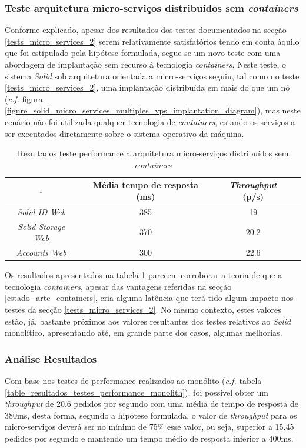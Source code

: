 \subsubsection{Teste arquitetura micro-serviços distribuídos sem \emph{containers} \label{tests_micro_services_3}}

Conforme explicado, apesar dos resultados dos testes documentados na secção \ref{tests_micro_services_2} serem relativamente satisfatórios tendo em conta àquilo que foi estipulado pela hipótese formulada, segue-se um novo teste com uma abordagem de implantação sem recurso à tecnologia \emph{containers}.
Neste teste, o sistema \emph{Solid} sob arquitetura orientada a micro-serviços seguiu, tal como no teste \ref{tests_micro_services_2}, uma implantação distribuída em mais do que um nó (\emph{c.f.} figura \ref{figure_solid_micro_services_multiples_vps_implantation_diagram}), mas neste cenário não foi utilizada qualquer tecnologia de \emph{containers}, estando os serviços a ser executados diretamente sobre o sistema operativo da máquina.

\begin{table}[h]
\centering
\caption{Resultados teste performance a arquitetura micro-serviços distribuídos sem \emph{containers}}
\label{r_t_m_s_3}
\vspace{0.5cm}
\begin{tabular}{c|c|c|c} 
 - & Média tempo de resposta (ms) & \emph{Throughput} (p/s) \\
\hline                          
\emph{Solid ID Web} & 385 & 19 \\
\emph{Solid Storage Web} & 370 & 20.2 \\
\emph{Accounts Web} & 300 & 22.6 \\
\end{tabular}
\end{table}

Os resultados apresentados na tabela \ref{r_t_m_s_3} parecem corroborar a teoria de que a tecnologia \emph{containers}, apesar das vantagens referidas na secção \ref{estado_arte_containers}, cria alguma latência que terá tido algum impacto nos testes da secção \ref{tests_micro_services_2}. No mesmo contexto, estes valores estão, já, bastante próximos aos valores resultantes dos testes relativos ao \emph{Solid} monolítico, apresentando até, em grande parte dos casos, algumas melhorias.

\subsubsection{Análise Resultados}
Com base nos testes de performance realizados ao monólito (\emph{c.f.} tabela \ref{table_resultados_testes_performance_monolith}), foi possível obter um \emph{throughput} de 20.6 pedidos por segundo com uma média de tempo de resposta de 380ms, desta forma, segundo a hipótese formulada, o valor de \emph{throughput} para os micro-serviços deverá ser no mínimo de 75\% esse valor, ou seja, superior a 15.45 pedidos por segundo e mantendo um tempo médio de resposta inferior a 400ms.

